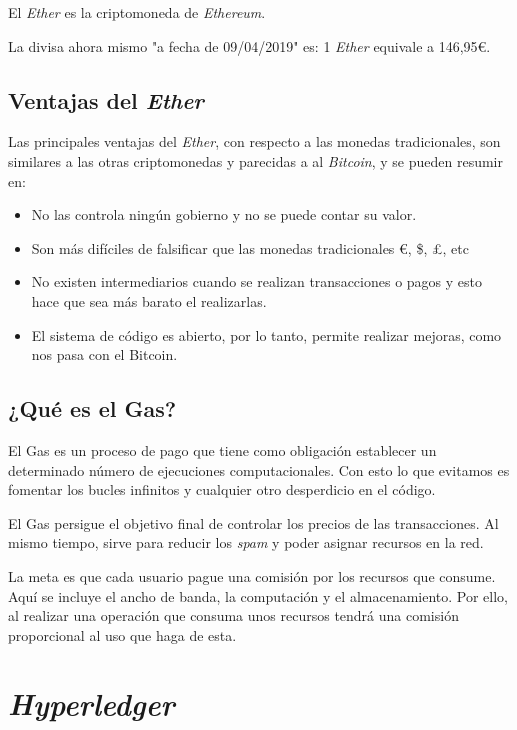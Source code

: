 El \textit{Ether} es la criptomoneda de \textit{Ethereum}.

La divisa ahora mismo "a fecha de 09/04/2019" es: 1 \textit{Ether}  equivale a 146,95\euro.

\subsection{Ventajas del \textit{Ether}}

Las principales ventajas del \textit{Ether}, con respecto a las monedas tradicionales, son similares a las otras criptomonedas y parecidas a al \textit{Bitcoin}, y se pueden resumir en:
\begin{itemize}
 	\item No las controla ningún gobierno y no se puede contar su valor. 
	\item Son más difíciles de falsificar que las monedas tradicionales \euro, \$, \pounds, etc
	\item No existen intermediarios cuando se realizan transacciones o pagos y esto hace que sea más barato el realizarlas.
	\item El sistema de código es abierto, por lo tanto, permite realizar mejoras, como nos pasa con el Bitcoin.
\end{itemize}

\subsection{¿Qué es el Gas?}

El Gas\cite{gas} es un proceso de pago que tiene como obligación establecer un determinado número de ejecuciones computacionales. Con esto lo que evitamos es fomentar los bucles infinitos y cualquier otro desperdicio en el código.

El Gas persigue el objetivo final de controlar los precios de las transacciones. Al mismo tiempo, sirve para reducir los \textit{spam} y poder asignar recursos en la red.

La meta es que cada usuario pague una comisión por los recursos que consume. Aquí se incluye el ancho de banda, la computación y el almacenamiento. Por ello, al realizar una operación que consuma unos recursos tendrá una comisión proporcional al uso que haga de esta.

\section{\textit{Hyperledger}}

